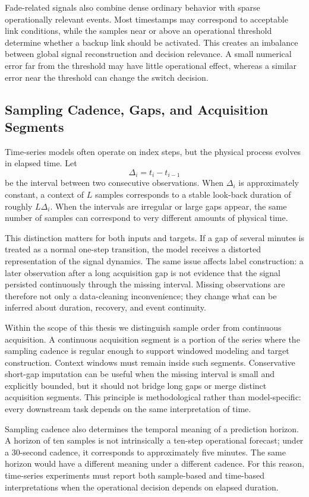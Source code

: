 Fade-related signals also combine dense ordinary behavior with sparse
operationally relevant events. Most timestamps may correspond to acceptable link
conditions, while the samples near or above an operational threshold determine
whether a backup link should be activated. This creates an imbalance between
global signal reconstruction and decision relevance. A small numerical error far
from the threshold may have little operational effect, whereas a similar error
near the threshold can change the switch decision.

\subsection{Sampling Cadence, Gaps, and Acquisition Segments}

Time-series models often operate on index steps, but the physical process
evolves in elapsed time. Let
\[
  \Delta_i = t_i - t_{i-1}
\]
be the interval between two consecutive observations. When \(\Delta_i\) is
approximately constant, a context of \(L\) samples corresponds to a stable
look-back duration of roughly \(L\Delta_i\). When the intervals are irregular or
large gaps appear, the same number of samples can correspond to very different
amounts of physical time.

This distinction matters for both inputs and targets. If a gap of several
minutes is treated as a normal one-step transition, the model receives a
distorted representation of the signal dynamics. The same issue affects label
construction: a later observation after a long acquisition gap is not evidence
that the signal persisted continuously through the missing interval. Missing
observations are therefore not only a data-cleaning inconvenience; they change
what can be inferred about duration, recovery, and event continuity.

Within the scope of this thesis we distinguish sample order from continuous
acquisition. A continuous acquisition segment is a portion of the series where
the sampling cadence is regular enough to support windowed modeling and target
construction. Context windows must remain inside such segments. Conservative
short-gap imputation can be useful when the missing interval is small and
explicitly bounded, but it should not bridge long gaps or merge distinct
acquisition segments. This principle is methodological rather than
model-specific: every downstream task depends on the same interpretation of
time.

Sampling cadence also determines the temporal meaning of a prediction horizon.
A horizon of ten samples is not intrinsically a ten-step operational forecast;
under a 30-second cadence, it corresponds to approximately five minutes. The
same horizon would have a different meaning under a different cadence. For this
reason, time-series experiments must report both sample-based and time-based
interpretations when the operational decision depends on elapsed duration.

